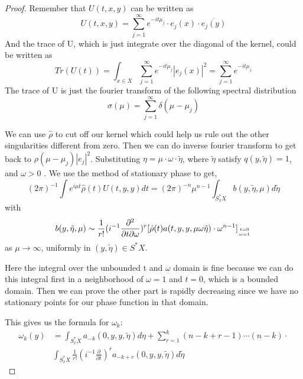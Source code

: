 \documentclass[10pt]{amsart}
\newcommand{\1}{\mathbb{1}}
\begin{document}
\begin{proof}
Remember that $U(t,x,y)$ can be written as
\[
U(t,x,y) = \sum_{j=1}^{\infty} e^{-it\mu_j} \cdot  e_j(x) \cdot  \overline{e_j(y)}
\]
And the trace of U, which is just integrate over the diagonal of the kernel, could be written as
\[
Tr( U(t)) = \int_{x\in X} \sum_{j = 1}^{\infty} e^{-it\mu_j}|e_j(x)|^2 = \sum_{j=1}^{\infty} e^{-it\mu_j}
\]
The trace of U is just the fourier transform of the following spectral distribution
\[
\sigma(\mu) = \sum_{j=1}^{\infty} \delta(\mu - \mu_j)
\]

We can use $\hat{\rho}$ to cut off our kernel which could help us rule out the other singularities different from zero. Then we can do inverse fourier transform to get back to $\rho(\mu-\mu_j)|e_j|^2$. Substituting $\eta = \mu \cdot \omega \cdot \tilde{\eta}$, where $\tilde{\eta}$ satisfy $q(y,\tilde{\eta}) =1$, and $\omega > 0$ . We use the method of stationary phase to get,
\[
(2\pi)^{-1} \int e^{i\mu t} \hat{\rho}(t) U(t,y,y) dt = (2\pi)^{-n} \mu^{n-1}\int_{S^*_x X} b(y,\tilde{\eta},\mu) d\tilde{\eta}
\]
with
\[
b(y,\tilde{\eta},\mu) \sim \frac{1}{r!}(i^{-1}\frac{\partial^2}{\partial t\partial \omega})^r[\hat{{\rho}}(t) a (t,y,y,\mu\omega\tilde{\eta}) \cdot \omega^{n-1}]_{t=0 \atop \omega =1}
\]
as $\mu \rightarrow \infty$, uniformly in $(y,\tilde{\eta}) \in S^*X$.

Here the integral over the unbounded t and $\omega$ domain is fine because we can do this integral first in a neighborhood of $\omega =1$ and $t = 0$, which is a bounded domain. Then we can prove the other part is rapidly decreasing since we have no stationary points for our phase function in that domain.

This gives us the formula for $\omega_k$:
\begin{align*}
    \omega_k(y) &= \int_{S^*_x X} a_{-k}(0,y,y,\tilde{\eta}) d\eta + \sum_{r=1}^k(n-k+r-1) \cdots (n-k)\cdot \\
    &\int_{S^*_x X} \frac{1}{r!}(i^{-1}\frac{\partial}{\partial t})^r a_{-k+r}(0,y,y,\tilde{\eta}) d\tilde{\eta}
\end{align*}


\end{proof}
\end{document}
